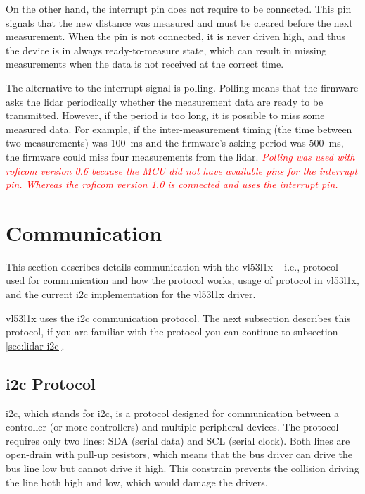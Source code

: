 \documentclass[
  digital,     %
  oneside,     %
  nosansbold,  %
  nocolorbold, %
  lof,         %
  lot,         %
]{fithesis4}
\newcommand{\TODO}[1]{\textcolor{red}{\textit{#1}}}
\begin{document}
{{{On the other hand, the interrupt pin does not require to be connected. This pin signals that the new distance was measured and must be cleared before the next measurement. When the pin is not connected, it is never driven high, and thus the device is in always ready-to-measure state, which can result in missing measurements when the data is not received at the correct time.

The alternative to the interrupt signal is polling. Polling means that the firmware asks the \acrshort{lidar} periodically whether the measurement data are ready to be transmitted. However, if the period is too long, it is possible to miss some measured data. For example, if the inter-measurement timing (the time between two measurements) was \qty{100}{\milli\second} and the firmware's asking period was \qty{500}{\milli\second}, the firmware could miss four measurements from the \acrshort{lidar}. \TODO{Polling was used with \acrshort{roficom} version 0.6 because the MCU did not have available pins for the interrupt pin. Whereas the \acrshort{roficom} version 1.0 is connected and uses the interrupt pin.}

\section{ Communication }
This section describes details communication with the \gls{vl53l1x} -- i.e., protocol used for communication and how the protocol works, usage of protocol in \gls{vl53l1x}, and the current \acrshort{i2c} implementation for the \gls{vl53l1x} driver. 

\gls{vl53l1x} uses the \acrshort{i2c} communication protocol. The next subsection describes this protocol, if you are familiar with the protocol you can continue to subsection \ref{sec:lidar-i2c}.

\subsection[ Inter-Integrated Circuit Protocol ]{ \acrlong{i2c} Protocol } \label{sec:i2c}
\acrshort{i2c}, which stands for \acrlong{i2c}, is a protocol designed for communication between a controller (or more controllers) and multiple peripheral devices. The protocol requires only two lines: SDA (serial data) and SCL (serial clock). Both lines are open-drain with pull-up resistors, which means that the bus driver can drive the bus line low but cannot drive it high. This constrain prevents the collision  driving the line both high and low, which would damage the drivers.

}}}
\end{document}
